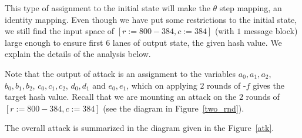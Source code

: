 This type of assignment to the initial state will make the {$\theta$} step mapping, an identity mapping. Even though we have put some restrictions to the initial state, we still find the input space of \KECCAK{}$[r:=800-384, c:=384]$ (with $1$ message block) large enough to ensure first $6$ lanes of output state, the given hash value. We explain the details of the analysis below. 

Note that the output of attack is an assignment to the variables $a_0, a_1, a_2$, $b_0, b_1, b_2$, $c_0, c_1, c_2$, $d_0, d_1$ and $e_0, e_1$, which on applying $2$ rounds of \KECCAK-$f$ gives the target hash value. Recall that we are mounting an attack on the $2$ rounds of \KECCAK{}$[r:=800-384, c:=384]$ (see the diagram in Figure~\ref{two_rnd}).

%
%
The overall attack is summarized in the  diagram given in the Figure~\ref{atk}. 
%
